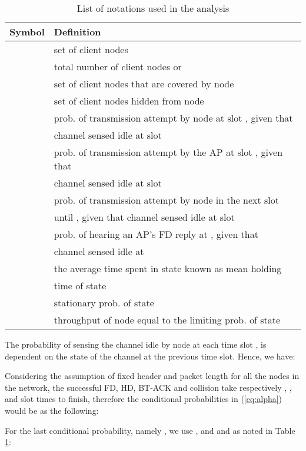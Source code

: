 \documentclass[10pt,journal,cspaper,compsoc]{IEEEtran}
\begin{document}
\small
\begin{table}
\caption{List of notations used in the analysis}
\begin{tabular}{| l | l |}
\hline
Symbol & Definition \\
\hline 
\hline
 & set of client nodes \\
 & total number of client nodes or \\
 & set of client nodes that are covered by node  \\
 & set of client nodes hidden from node  \\
 & prob. of transmission attempt by node  at slot , given that \\
& channel sensed idle at slot \\
 & prob. of transmission attempt by the AP at slot , given that \\
& channel sensed idle at slot \\
 & prob. of transmission attempt by node  in the next  slot \\
& until , given that channel sensed idle at slot \\
 & prob. of hearing an AP's FD reply at , given that \\ & channel sensed idle at \\
 & the average time spent in state  known as mean holding  \\
& time of state  \\
 & stationary prob. of state  \\
 & throughput of node  equal to the limiting prob. of state  \\
\hline
\end{tabular}
\vspace{1mm}
\label{tab:note}
\end{table}
\normalsize

The probability of sensing the channel idle by node  at each time slot ,  is dependent on the state of the channel at the previous time slot. Hence, we have: 
\small

\normalsize
Considering the assumption of fixed header and packet length for all the nodes in the network, the successful FD, HD, BT-ACK and collision take respectively , ,  and  slot times to finish, therefore the conditional probabilities in (\ref{eq:alpha}) would be as the following:
\small
  
\normalsize

For the last conditional probability, namely , we use ,  and  and  as noted in Table \ref{tab:note}:
\end{document}

